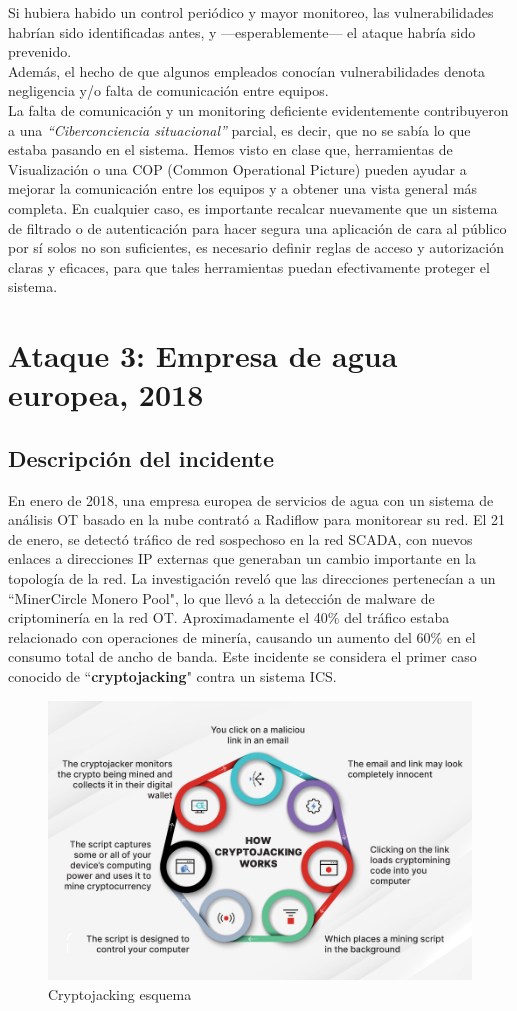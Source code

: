 Si hubiera habido un control periódico y mayor monitoreo, las vulnerabilidades habrían sido identificadas antes, y ---esperablemente--- el ataque habría sido prevenido.\\
Además, el hecho de que algunos empleados conocían vulnerabilidades denota negligencia y/o falta de comunicación entre equipos.\\
La falta de comunicación y un monitoring deficiente evidentemente contribuyeron a una \textit{``Ciberconciencia situacional''} parcial, es decir, que no se sabía lo que estaba pasando en el sistema. Hemos visto en clase que, herramientas de Visualización o una COP (Common Operational Picture) pueden ayudar a mejorar la comunicación entre los equipos y a obtener una vista general más completa.
En cualquier caso, es importante recalcar nuevamente que un sistema de filtrado o de autenticación para hacer segura una aplicación de cara al público por sí solos no son suficientes, es necesario definir reglas de acceso y autorización claras y eficaces, para que tales herramientas puedan efectivamente proteger el sistema.
\newpage
\section{Ataque 3: Empresa de agua europea, 2018}

\subsection{Descripción del incidente}
En enero de 2018, una empresa europea de servicios de agua con un sistema de análisis OT basado en la nube contrató a Radiflow para monitorear su red. El 21 de enero, se detectó tráfico de red sospechoso en la red SCADA, con nuevos enlaces a direcciones IP externas que generaban un cambio importante en la topología de la red. La investigación reveló que las direcciones pertenecían a un ``MinerCircle Monero Pool", lo que llevó a la detección de malware de criptominería en la red OT. Aproximadamente el 40\% del tráfico estaba relacionado con operaciones de minería, causando un aumento del 60\% en el consumo total de ancho de banda. Este incidente se considera el primer caso conocido de ``\textbf{cryptojacking}" contra un sistema ICS.

\begin{figure}[htbp]
    \centering
    \includegraphics[width=0.85\columnwidth]{images/cryptojacking.jpg}
    \caption{Cryptojacking esquema}
    \label{fig:cryptojacking}
\end{figure}

